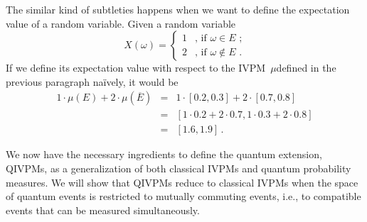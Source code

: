\documentclass[english,reprint, aps, prl,superscriptaddress, showpacs,
showkeys, longbibliography, amsmath, amssymb]{revtex4-1}
\theoremstyle{plain}
\theoremstyle{definition}
\begin{document}
The similar kind of subtleties happens when we want to define the
expectation value of a random variable. Given a random variable
\begin{equation}
X\left(\omega\right)=\begin{cases}
1 & \textrm{, if }\omega\in E\textrm{ ;}\\
2 & \textrm{, if }\omega\notin E\textrm{ .}
\end{cases}
\end{equation}
If we define its expectation value with respect to the IVPM~$\mu$defined
in the previous paragraph naïvely, it would be\begin{subequations}
\begin{eqnarray}
1\cdot\mu(E)+2\cdot\mu(\overline{E}) & = & 1\cdot[0.2,0.3]+2\cdot[0.7,0.8]\\
 & = & [1\cdot0.2+2\cdot0.7,1\cdot0.3+2\cdot0.8]\\
 & = & [1.6,1.9]\,.
\end{eqnarray}
\end{subequations}

We now have the necessary ingredients to define the quantum extension,
QIVPMs, as a generalization of both classical IVPMs and quantum
probability measures. We will show that QIVPMs reduce to classical
IVPMs when the space of quantum events is restricted to mutually
commuting events, i.e., to compatible events that can be measured
simultaneously.
\end{document}
